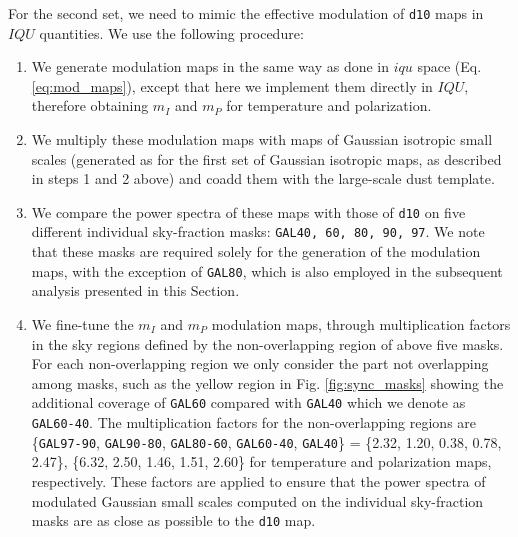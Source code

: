 \documentclass[twocolumn]{aastex631}
\begin{document}
For the second set, we need to mimic the effective modulation of \texttt{d10} maps in $IQU$ quantities. We use the following procedure:
\begin{enumerate}
\item We generate modulation maps in the same way as done in $iqu$ space (Eq. \ref{eq:mod_maps}), except that here we implement them directly in $IQU$, therefore obtaining $m_I$ and $m_P$ for temperature and polarization.

\item We multiply these modulation maps with maps of Gaussian isotropic small scales (generated as for the first set of Gaussian isotropic maps, as described in steps 1 and 2 above) and coadd them with the large-scale dust template.

\item We compare the power spectra of these maps with those of \texttt{d10} on five different individual sky-fraction masks: \texttt{GAL40, 60, 80, 90, 97}. We note that these masks are required solely for the generation of the modulation maps, with the exception of \texttt{GAL80}, which is also employed in the subsequent analysis presented in this Section. 

\item{We fine-tune the $m_I$ and $m_P$ modulation maps, through multiplication factors in the sky regions defined by the non-overlapping region of above five masks. For each non-overlapping region we only consider the part not overlapping among masks, such as the yellow region in Fig. \ref{fig:sync_masks} showing the additional coverage of \texttt{GAL60} compared with \texttt{GAL40}} which we denote as \texttt{GAL60-40}. The multiplication factors for the non-overlapping regions are \{\texttt{GAL97-90}, \texttt{GAL90-80}, \texttt{GAL80-60}, \texttt{GAL60-40}, \texttt{GAL40}\} = \{2.32, 1.20, 0.38, 0.78, 2.47\}, \{6.32, 2.50, 1.46, 1.51, 2.60\} for temperature and polarization maps, respectively. These factors are applied to ensure that the power spectra of modulated Gaussian small scales computed on the individual sky-fraction masks are as close as possible to the \texttt{d10} map.

\end{enumerate}
\end{document}
